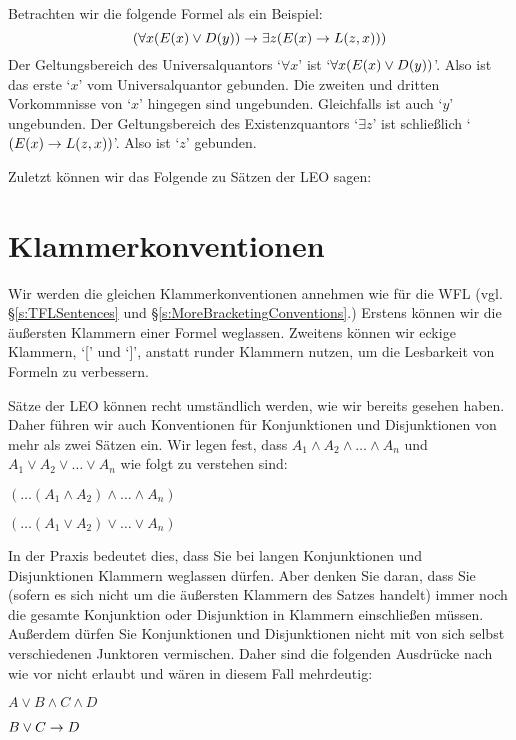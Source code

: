 
        
Betrachten wir die folgende Formel als ein Beispiel:
	$$(\forall x(\mathord{E}(x) \vee \mathord{D}(y)) \rightarrow \exists z(\mathord{E}(x) \rightarrow \mathord{L}(z,x)))$$
Der Geltungsbereich des Universalquantors `$\forall x$' ist `$\forall x (\mathord{E}(x) \vee \mathord{D}(y))$'. Also ist das erste `$x$' vom Universalquantor gebunden. Die zweiten und dritten Vorkommnisse von `$x$' hingegen sind ungebunden. Gleichfalls ist auch `$y$' ungebunden. Der Geltungsbereich des Existenzquantors `$\exists z$' ist schlie{\ss}lich `$(\mathord{E}(x) \rightarrow \mathord{L}(z,x))$'. Also ist `$z$' gebunden. 

Zuletzt können wir das Folgende zu Sätzen der LEO sagen:	


\section{Klammerkonventionen}

Wir werden die gleichen Klammerkonventionen annehmen wie für die WFL (vgl. \S\ref{s:TFLSentences} und \S\ref{s:MoreBracketingConventions}.) Erstens können wir die äu{\ss}ersten Klammern einer Formel weglassen. Zweitens können wir eckige Klammern, `[' und `]', anstatt runder Klammern nutzen, um die Lesbarkeit von Formeln zu verbessern.

Sätze der LEO können recht umständlich werden, wie wir bereits gesehen haben. Daher führen wir auch Konventionen für Konjunktionen und Disjunktionen von mehr als zwei Sätzen ein. Wir legen fest, dass $A_1 \land A_2 \land \dots \land A_n$ und $A_1 \lor A_2 \lor \dots \lor A_n$ wie folgt zu verstehen sind:
\begin{earg}
	\item[] $(\dots(A_1 \land A_2) \land \dots \land A_n)$
	\item[] $(\dots(A_1 \lor A_2) \lor \dots \lor A_n)$
\end{earg}
In der Praxis bedeutet dies, dass Sie bei langen Konjunktionen und Disjunktionen Klammern weglassen dürfen. Aber denken Sie daran, dass Sie (sofern es sich nicht um die äu{\ss}ersten Klammern des Satzes handelt) immer noch die gesamte Konjunktion oder Disjunktion in Klammern einschlie{\ss}en müssen. Au{\ss}erdem dürfen Sie Konjunktionen und Disjunktionen nicht mit von sich selbst verschiedenen Junktoren vermischen. Daher sind die folgenden Ausdrücke nach wie vor nicht erlaubt und wären in diesem Fall mehrdeutig:
\begin{earg}
	\item[] $A \lor B \land C \land D$
	\item[] $B \lor C \rightarrow D$
\end{earg}

